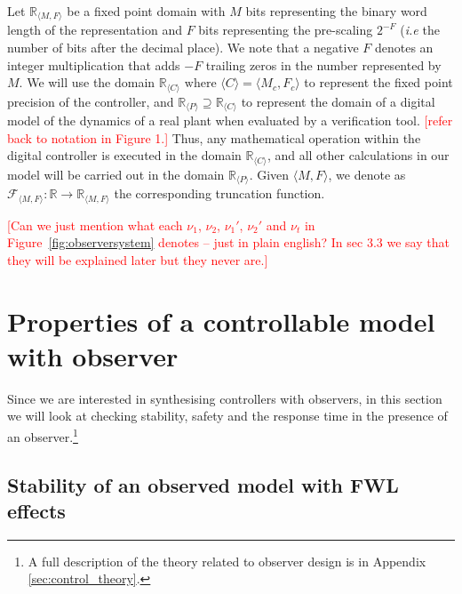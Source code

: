 \documentclass[sigconf]{llncs}
\renewcommand{\note}[1]{\textcolor{red}{[#1]}}
\begin{document}
Let $\mathbb{R}_{\langle M,F \rangle}$ be a fixed point domain with $M$ bits
representing the binary word length of the representation and $F$ bits
representing the pre-scaling $2^{-F}$ (\emph{i.e} the number of bits after
the decimal place).  We note that a negative $F$ denotes an integer
multiplication that adds $-F$ trailing zeros in the number represented by
$M$. 
We will use the domain $\mathbb{R}_{\langle C \rangle} \text{ where } \langle C \rangle = \langle M_c,F_c \rangle$
to represent the fixed point precision of the controller, and 
$\mathbb{R}_{\langle P \rangle} \supseteq \mathbb{R}_{\langle C \rangle}$
to represent the domain of a digital model of the dynamics of a real plant when
evaluated by a verification tool. \note{refer back to notation in Figure 1.}
Thus, any mathematical operation within the digital controller is executed in the
domain $\mathbb{R}_{\langle C \rangle}$, and all other calculations
in our model will be carried out in the domain $\mathbb{R}_{\langle P \rangle}$.
Given ${\langle M,F \rangle}$, 
we denote as $\mathcal{F}_{\langle M,F \rangle} : \mathbb{R} \rightarrow \mathbb{R}_{\langle M,F \rangle}$ the corresponding truncation function. 

\note{Can we just mention what each $\nu_1$, $\nu_2$, $\nu_1'$, $\nu_2'$ and $\nu_t$ in Figure~\ref{fig:observersystem} denotes -- just in plain english? In sec 3.3 we say that they will be explained later but they never are.}   


\section{Properties of a controllable model with observer}\label{sec:cof_verification}

Since we are interested in synthesising controllers with observers, 
in this section we will look at checking stability, safety and the response time in the presence of an observer.\footnote{A full description of
the theory related to observer design is in Appendix \ref{sec:control_theory}.}

\subsection{Stability of an observed model with FWL effects}\label{sec:cof_fwl_stability}
\end{document}
